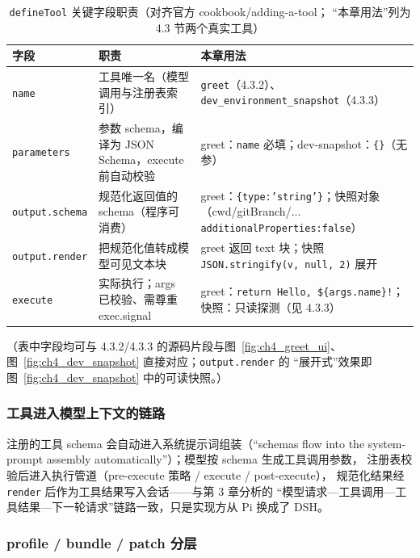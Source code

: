 \begin{table}[H]
\centering
\caption{\texttt{defineTool} 关键字段职责（对齐官方 cookbook/adding-a-tool；
``本章用法''列为 4.3 节两个真实工具）}
\label{tab:ch4_defineTool}
\small
\setlength{\tabcolsep}{4pt}
\begin{tabular}{lp{4.1cm}p{4.5cm}}
\toprule
\textbf{字段} & \textbf{职责} & \textbf{本章用法} \\
\midrule
\texttt{name} & 工具唯一名（模型调用与注册表索引） & \texttt{greet}（4.3.2）、\texttt{dev\_environment\_snapshot}（4.3.3） \\
\texttt{parameters} & 参数 schema，编译为 JSON Schema，execute 前自动校验 & greet：\texttt{name} 必填；dev-snapshot：\texttt{\{\}}（无参） \\
\texttt{output.schema} & 规范化返回值的 schema（程序可消费） & greet：\texttt{\{type:'string'\}}；快照对象（cwd/gitBranch/... \texttt{additionalProperties:false}） \\
\texttt{output.render} & 把规范化值转成模型可见文本块 & greet 返回 text 块；快照 \texttt{JSON.stringify(v, null, 2)} 展开 \\
\texttt{execute} & 实际执行；args 已校验、需尊重 exec.signal & greet：\texttt{return Hello, \$\{args.name\}!}；快照：只读探测（见 4.3.3） \\
\bottomrule
\end{tabular}
\end{table}

（表中字段均可与 4.3.2/4.3.3 的源码片段与图~\ref{fig:ch4_greet_ui}、
图~\ref{fig:ch4_dev_snapshot} 直接对应；\texttt{output.render} 的
``展开式''效果即图~\ref{fig:ch4_dev_snapshot} 中的可读快照。）

\subsubsection{工具进入模型上下文的链路}

注册的工具 schema 会自动进入系统提示词组装（``schemas flow into the
system-prompt assembly automatically''）；模型按 schema 生成工具调用参数，
注册表校验后进入执行管道（pre-execute 策略 / execute / post-execute），
规范化结果经 \texttt{render} 后作为工具结果写入会话——与第 3 章分析的
``模型请求—工具调用—工具结果—下一轮请求''链路一致，只是实现方从 Pi
换成了 DSH。

\subsubsection{profile / bundle / patch 分层}

